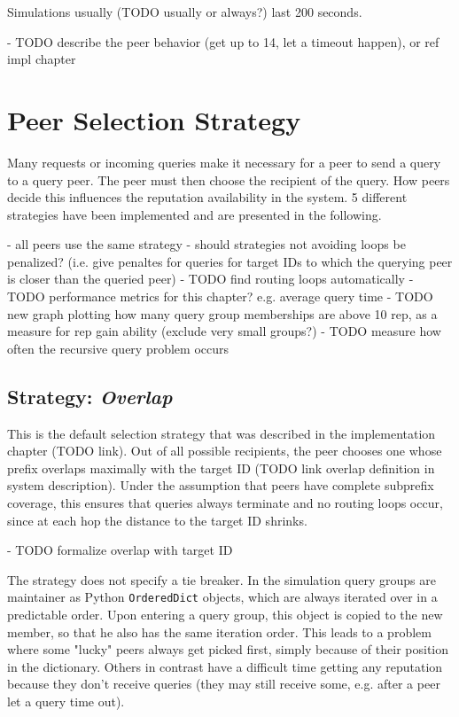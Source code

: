 Simulations usually (TODO usually or always?) last 200 seconds.

- TODO describe the peer behavior (get up to 14, let a timeout happen), or ref
  impl chapter

\section{Peer Selection Strategy}
\label{sec:selection}
Many requests or incoming queries make it necessary for a peer to send a query
to a query peer. The peer must then choose the recipient of the query. How peers
decide this influences the reputation availability in the system. 5 different
strategies have been implemented and are presented in the following.

- all peers use the same strategy
- should strategies not avoiding loops be penalized? (i.e. give penaltes for
  queries for target IDs to which the querying peer is closer than the queried
  peer)
- TODO find routing loops automatically
- TODO performance metrics for this chapter? e.g. average query time
- TODO new graph plotting how many query group memberships are above 10 rep, as
  a measure for rep gain ability (exclude very small groups?)
- TODO measure how often the recursive query problem occurs

\subsection{Strategy: \emph{Overlap}}
This is the default selection strategy that was described in the implementation
chapter (TODO link). Out of all possible recipients, the peer chooses one whose
prefix overlaps maximally with the target ID (TODO link overlap definition in
system description). Under the assumption that peers have complete subprefix
coverage, this ensures that queries always terminate and no routing loops occur,
since at each hop the distance to the target ID shrinks.

- TODO formalize overlap with target ID

The strategy does not specify a tie breaker. In the simulation query groups are
maintainer as Python \texttt{OrderedDict} objects, which are always iterated
over in a predictable order. Upon entering a query group, this object is copied
to the new member, so that he also has the same iteration order. This leads to a
problem where some "lucky" peers always get picked first, simply because of
their position in the dictionary. Others in contrast have a difficult time
getting any reputation because they don't receive queries (they may still
receive some, e.g.  after a peer let a query time out).

